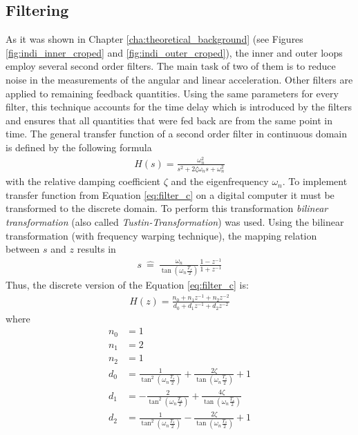 \documentclass[11pt, a4paper, twoside]{report}
\begin{document}
\subsection{Filtering} \label{subsec:filtering}

As it was shown in Chapter \ref{cha:theoretical_background} (see Figures \ref{fig:indi_inner_croped} and \ref{fig:indi_outer_croped}), the inner and outer loops employ several second order filters. The main task of two of them is to reduce  noise in the measurements of the angular and linear acceleration. Other filters are applied to remaining feedback quantities. Using the same parameters for every filter, this technique accounts for the time delay which is introduced by the filters and ensures that all quantities that were fed back are from the same point in time. The general transfer function of a second order filter in continuous domain is defined by the following formula
\begin{equation}
	\begin{split}
		H(s) = \frac{\omega_n^2}{s^2+2\zeta\omega_ns+\omega_n^2}
		\label{eq:filter_c}
	\end{split}
\end{equation}
with the relative damping coefficient $\zeta$ and the eigenfrequency $\omega_n$. To implement transfer function from Equation \ref{eq:filter_c} on a digital computer it must be transformed to the discrete domain. To perform this transformation \textit{bilinear transformation} (also called \textit{Tustin-Transformation}) was used. Using the bilinear transformation (with frequency warping technique), the mapping relation between $s$ and $z$ results in
\begin{equation}
	\begin{split}
		s \ \widehat{=} \ \frac{\omega_n}{\tan(\omega_n\frac{T_s}{2})} \frac{1-z^{-1}}{1+z^{-1}}
		\label{eq:filter_c}
	\end{split}
\end{equation}
Thus, the discrete version of the Equation \ref{eq:filter_c} is:
\begin{equation}
	\begin{split}
		H(z) = \frac{n_0 + n_1z^{-1} + n_2z^{-2}}{d_0 + d_1z^{-1} + d_2z^{-2}}
		\label{eq:filter_d}
	\end{split}
\end{equation}
where 
\begin{subequations}
	\begin{align}
		n_0 &= 1 \\
		n_1 &= 2\\
		n_2 &= 1 \\
		d_0 &= \frac{1}{\tan^2(\omega_n\frac{T_s}{2})} + \frac{2\zeta}{\tan(\omega_n\frac{T_s}{2})} + 1 \\
		d_1 &= -\frac{2}{\tan^2(\omega_n\frac{T_s}{2})} + \frac{4\zeta}{\tan(\omega_n\frac{T_s}{2})} \\
		d_2 &= \frac{1}{\tan^2(\omega_n\frac{T_s}{2})} - \frac{2\zeta}{\tan(\omega_n\frac{T_s}{2})} + 1
	\end{align}
	\label{eq:filter_parameters}
\end{subequations}
\end{document}
